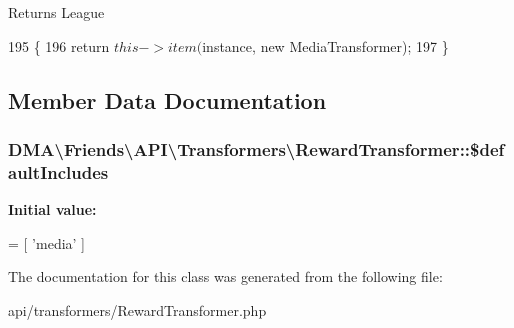 \begin{DoxyReturn}{Returns}
League 
\end{DoxyReturn}

\begin{DoxyCode}
195     \{
196         \textcolor{keywordflow}{return} $this->item($instance, \textcolor{keyword}{new} MediaTransformer);
197     \}
\end{DoxyCode}


\subsection{Member Data Documentation}
\hypertarget{classDMA_1_1Friends_1_1API_1_1Transformers_1_1RewardTransformer_a303f3145936aae98cbdc990fa104be71}{}
\subsubsection[{\$default\+Includes}]{\setlength{\rightskip}{0pt plus 5cm}D\+M\+A\textbackslash{}\+Friends\textbackslash{}\+A\+P\+I\textbackslash{}\+Transformers\textbackslash{}\+Reward\+Transformer\+::\$default\+Includes\hspace{0.3cm}{\ttfamily [protected]}}\label{classDMA_1_1Friends_1_1API_1_1Transformers_1_1RewardTransformer_a303f3145936aae98cbdc990fa104be71}
{\bfseries Initial value\+:}
\begin{DoxyCode}
= [
            \textcolor{stringliteral}{'media'}
    ]
\end{DoxyCode}


The documentation for this class was generated from the following file\+:\begin{DoxyCompactItemize}
\item 
api/transformers/Reward\+Transformer.\+php\end{DoxyCompactItemize}

